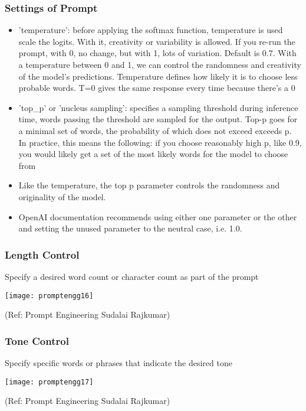 \begin{frame}[fragile]\frametitle{Settings of Prompt}

\begin{itemize}
\item 'temperature':  before applying the softmax function, temperature is used scale the logits. With it, creativity or variability is allowed. If you re-run the prompt, with 0, no change, but with 1, lots of variation. Default is 0.7. With a temperature between 0 and 1, we can control the randomness and creativity of the model's predictions. Temperature defines how likely it is to choose less probable words. T=0 gives the same response every time because there's a 0%
\item 'top\_p' or 'nucleus sampling': specifies a sampling threshold during inference time, words passing the threshold are sampled for the output. Top-p goes for a minimal set of words, the probability of which does not exceed exceeds p. In practice, this means the following: if you choose reasonably high p, like 0.9, you would likely get a set of the most likely words for the model to choose from
\item Like the temperature, the top p parameter controls the randomness and originality of the model.
\item OpenAI documentation recommends using either one parameter or the other and setting the unused parameter to the neutral case, i.e. 1.0.
\end{itemize}
		
\end{frame}


\begin{frame}[fragile]\frametitle{Length Control}

Specify a desired word count or character count as part of the prompt

\begin{center}
\texttt{[image: promptengg16]}

{\tiny (Ref: Prompt Engineering Sudalai Rajkumar)}

\end{center}		

\end{frame}

\begin{frame}[fragile]\frametitle{Tone Control}

Specify specific words or phrases that indicate the desired tone

\begin{center}
\texttt{[image: promptengg17]}

{\tiny (Ref: Prompt Engineering Sudalai Rajkumar)}

\end{center}		

\end{frame}


